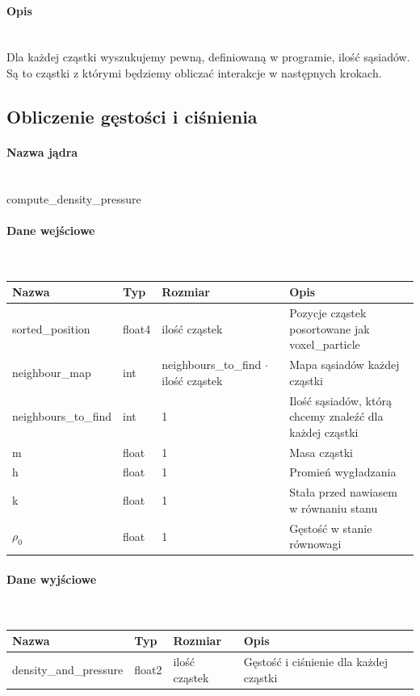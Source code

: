 \documentclass[polish, 12pt]{aghthesis}
\begin{document}
				\paragraph{Opis} \ \\
					\indent Dla każdej cząstki wyszukujemy pewną, definiowaną w programie, ilość sąsiadów. Są to cząstki z którymi będziemy obliczać interakcje w następnych krokach.
 
		\subsection{Obliczenie gęstości i ciśnienia}
				\paragraph{Nazwa jądra} \ \\
					compute\_density\_pressure
				\paragraph{Dane wejściowe} \ \\
					\begin{tabular}{| p{} | p{} | p{} | p{} |}
					\hline
						Nazwa & Typ & Rozmiar & Opis \\
					\hline
						sorted\_position & float4 & ilość cząstek & Pozycje cząstek posortowane jak voxel\_particle\\
					\hline
						neighbour\_map & int & neighbours\_to\_find ${\cdot}$ ilość cząstek & Mapa sąsiadów każdej cząstki\\
					\hline
						neighbours\_to\_find & int & 1 & Ilość sąsiadów, którą chcemy znaleźć dla każdej cząstki \\ 
					\hline
						m & float & 1 & Masa cząstki \\ 
					\hline
						h & float & 1 & Promień wygładzania \\ 
					\hline
						k & float & 1 & Stała przed nawiasem w równaniu stanu \\ 
					\hline
						${\rho_0}$ & float & 1 & Gęstość w stanie równowagi \\ 
					\hline	
				\end{tabular}
				\paragraph{Dane wyjściowe} \ \\
					\begin{tabular}{| p{} | p{} | p{} | p{} |}
					\hline
						Nazwa & Typ & Rozmiar & Opis \\
					\hline
						density\_and\_pressure & float2 & ilość cząstek & Gęstość i ciśnienie dla każdej cząstki\\
					\hline
				\end{tabular}
\end{document}
